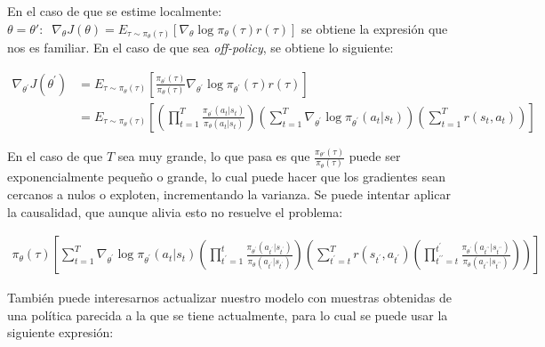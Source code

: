 En el caso de que se estime localmente: $\theta=\theta':\;\;\nabla_\theta J(\theta) = E_{\tau
\sim \pi_\theta(\tau)}[\nabla_\theta\log\pi_\theta(\tau)r(\tau)]$ se obtiene la expresión que nos
es familiar. En el caso de que sea \textit{off-policy}, se obtiene lo siguiente:

\begin{align}
    \nabla _ { \theta ^ { \prime } } J ( \theta ^ { \prime } ) &= E _ { \tau \sim \pi _ { \theta
    } ( \tau ) } [ \frac { \pi _ { \theta ^ { \prime } } ( \tau ) } { \pi _ { \theta } ( \tau ) }
    \nabla _ { \theta ^ { \prime } } \operatorname { log } \pi _ { \theta ^ { \prime } } ( \tau )
    r ( \tau ) ]\\
&= E _ { \tau \sim \pi _ { \theta } ( \tau ) } [ ( \prod _ { t = 1 } ^ { T } \frac { \pi _ { \theta ^ { \prime } } ( a _ { t } | s _ { t } ) } { \pi _ { \theta } ( a _ { t } | s _ { t } ) } ) ( \sum _ { t = 1 } ^ { T } \nabla _ { \theta ^ { \prime } } \operatorname { log } \pi _ { \theta ^ { \prime } } ( a _ { t } | s _ { t } ) ) ( \sum _ { t = 1 } ^ { T } r ( s _ { t } , a _ { t } ) ) ]
\end{align}

En el caso de que $T$ sea muy grande, lo que pasa es que
$\frac{\pi_{\theta'}(\tau)}{\pi_{\theta}(\tau)}$ puede ser exponencialmente pequeño o grande, lo
cual puede hacer que los gradientes sean cercanos a nulos o exploten, incrementando la
varianza. Se puede intentar aplicar la causalidad, que aunque alivia esto no resuelve el problema:

\begin{align}
\pi _ { \theta } ( \tau ) [ \sum _ { t = 1 } ^ { T } \nabla _ { \theta ^ { \prime } } \operatorname { log } \pi _ { \theta ^ { \prime } } ( a _ { t } | s _ { t } ) ( \prod _ { t ^ { \prime } = 1 } ^ { t } \frac { \pi _ { \theta ^ { \prime } } ( a _ { t ^ { \prime } } | s _ { t ^ { \prime } } ) } { \pi _ { \theta } ( a _ { t ^ { \prime } } | s _ { t ^ { \prime } } ) } ) ( \sum _ { t ^ { \prime } = t } ^ { T } r ( s _ { t ^ { \prime } } , a _ { t ^ { \prime } } ) ( \prod _ { t ^ { \prime \prime } = t } ^ { t ^ { \prime } } \frac { \pi _ { \theta ^ { \prime } } ( a _ { t ^ { \prime \prime } } | s _ { t ^ { \prime \prime } } ) } { \pi _ { \theta } ( a _ { t ^ { \prime \prime } } | s _ { t ^ { \prime \prime } } ) } ) ) ]
\end{align}

También puede interesarnos actualizar nuestro modelo con muestras obtenidas de una política
parecida a la que se tiene actualmente, para lo cual se puede usar la siguiente expresión:

